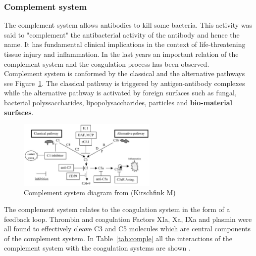 \documentclass[%
 nofootinbib,
 amsmath,amssymb,
 aps,
 pra,
]{revtex4-1}
\begin{document}
\subsubsection{Complement system}
The complement system allows antibodies to kill some bacteria. This activity was said to "complement" the antibacterial activity of the antibody and hence the name. It has fundamental clinical implications in the context of life-threatening tissue injury and inflammation. In the last years an important relation of the complement system and the coagulation process has been observed.\\
Complement system is conformed by the classical and the alternative pathways see Figure~\ref{diag:complement}. The classical pathway is triggered by antigen-antibody complexes while the alternative pathway is activated by foreign surfaces such as fungal, bacterial polyssaccharides, lipopolysaccharides, particles and \textbf{bio-material surfaces}.\\
\hspace{1cm}
\begin{figure}[h]
\includegraphics[width=0.6\textwidth]{Figures/contactsystem.png}
\caption{\label{diag:complement} Complement system diagram from \cite{Gorbet:2004} (Kirschfink M)}
\end{figure}
The complement system relates to the coagulation system in the form of a feedback loop. Thrombin and coagulation Factors XIa, Xa, IXa and plasmin were all found to effectively cleave C3 and C5 molecules which are central components of the complement system. In Table~\ref{tab:comple} all the interactions of the complement system with the coagulation systems are shown \citep{Gorbet:2004}.\\
\end{document}
